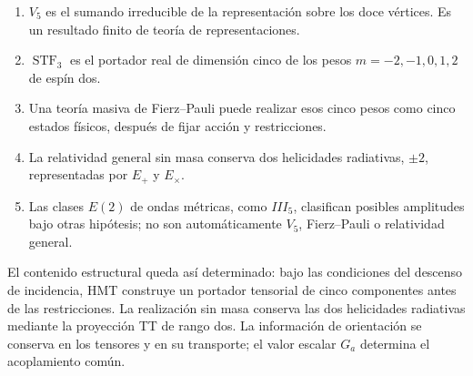 \begin{enumerate}
\item \(V_5\) es el sumando irreducible de la representaci\'on sobre los
doce v\'ertices. Es un resultado finito de teor\'ia de representaciones.
\item \(\operatorname{STF}_3\) es el portador real de dimensi\'on cinco de
los pesos \(m=-2,-1,0,1,2\) de esp\'in dos.
\item Una teor\'ia masiva de Fierz--Pauli puede realizar esos cinco pesos
como cinco estados f\'isicos, despu\'es de fijar acci\'on y restricciones.
\item La relatividad general sin masa conserva dos helicidades radiativas,
\(\pm2\), representadas por \(E_+\) y \(E_\times\).
\item Las clases \(E(2)\) de ondas m\'etricas, como \(III_5\), clasifican
posibles amplitudes bajo otras hip\'otesis; no son autom\'aticamente
\(V_5\), Fierz--Pauli o relatividad general.
\end{enumerate}

El contenido estructural queda así determinado: bajo las condiciones del
descenso de incidencia, HMT construye un portador tensorial de cinco
componentes antes de las restricciones. La realización sin masa conserva
las dos helicidades radiativas mediante la proyección TT de rango dos.
La información de orientación se conserva en los tensores y en su
transporte; el valor escalar \(G_a\) determina el acoplamiento común.
